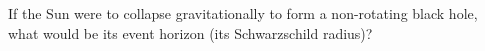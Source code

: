 If the Sun were to collapse gravitationally to form a non-rotating black hole,
what would be its event horizon (its Schwarzschild radius)?
